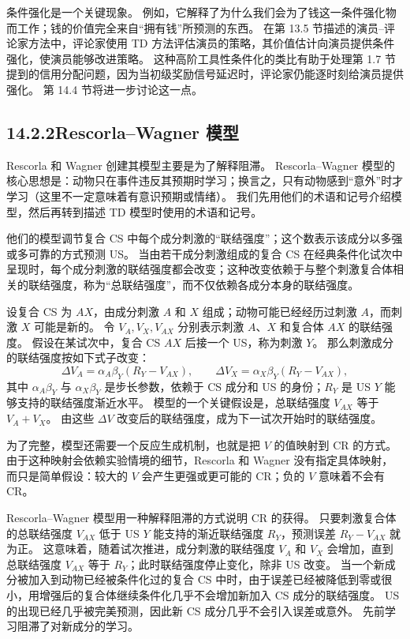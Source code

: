 \documentclass[UTF8, 12pt, fontset=fandol, oneside]{ctexart}
\begin{document}
条件强化是一个关键现象。
例如，它解释了为什么我们会为了钱这一条件强化物而工作；钱的价值完全来自“拥有钱”所预测的东西。
在第 13.5 节描述的演员--评论家方法中，评论家使用 TD 方法评估演员的策略，其价值估计向演员提供条件强化，使演员能够改进策略。
这种高阶工具性条件化的类比有助于处理第 1.7 节提到的信用分配问题，因为当初级奖励信号延迟时，评论家仍能逐时刻给演员提供强化。
第 14.4 节将进一步讨论这一点。

\subsection*{14.2.2\quad Rescorla--Wagner 模型}

Rescorla 和 Wagner 创建其模型主要是为了解释阻滞。
Rescorla--Wagner 模型的核心思想是：动物只在事件违反其预期时学习；换言之，只有动物感到“意外”时才学习（这里不一定意味着有意识预期或情绪）。
我们先用他们的术语和记号介绍模型，然后再转到描述 TD 模型时使用的术语和记号。

他们的模型调节复合 CS 中每个成分刺激的“联结强度”；这个数表示该成分以多强或多可靠的方式预测 US。
当由若干成分刺激组成的复合 CS 在经典条件化试次中呈现时，每个成分刺激的联结强度都会改变；这种改变依赖于与整个刺激复合体相关的联结强度，称为“总联结强度”，而不仅依赖各成分本身的联结强度。

设复合 CS 为 $AX$，由成分刺激 $A$ 和 $X$ 组成；动物可能已经经历过刺激 $A$，而刺激 $X$ 可能是新的。
令 $V_A,V_X,V_{AX}$ 分别表示刺激 $A$、$X$ 和复合体 $AX$ 的联结强度。
假设在某试次中，复合 CS $AX$ 后接一个 US，称为刺激 $Y$。
那么刺激成分的联结强度按如下式子改变：
\[
\Delta V_A=\alpha_A\beta_Y(R_Y-V_{AX}),\qquad
\Delta V_X=\alpha_X\beta_Y(R_Y-V_{AX}),
\]
其中 $\alpha_A\beta_Y$ 与 $\alpha_X\beta_Y$ 是步长参数，依赖于 CS 成分和 US 的身份；$R_Y$ 是 US $Y$ 能够支持的联结强度渐近水平。
模型的一个关键假设是，总联结强度 $V_{AX}$ 等于 $V_A+V_X$。
由这些 $\Delta V$ 改变后的联结强度，成为下一试次开始时的联结强度。

为了完整，模型还需要一个反应生成机制，也就是把 $V$ 的值映射到 CR 的方式。
由于这种映射会依赖实验情境的细节，Rescorla 和 Wagner 没有指定具体映射，而只是简单假设：较大的 $V$ 会产生更强或更可能的 CR；负的 $V$ 意味着不会有 CR。

Rescorla--Wagner 模型用一种解释阻滞的方式说明 CR 的获得。
只要刺激复合体的总联结强度 $V_{AX}$ 低于 US $Y$ 能支持的渐近联结强度 $R_Y$，预测误差 $R_Y-V_{AX}$ 就为正。
这意味着，随着试次推进，成分刺激的联结强度 $V_A$ 和 $V_X$ 会增加，直到总联结强度 $V_{AX}$ 等于 $R_Y$；此时联结强度停止变化，除非 US 改变。
当一个新成分被加入到动物已经被条件化过的复合 CS 中时，由于误差已经被降低到零或很小，用增强后的复合体继续条件化几乎不会增加新加入 CS 成分的联结强度。
US 的出现已经几乎被完美预测，因此新 CS 成分几乎不会引入误差或意外。
先前学习阻滞了对新成分的学习。
\end{document}
